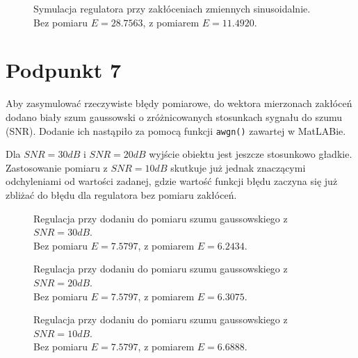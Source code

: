 \begin{figure}[ht]
\centering

\caption{Symulacja regulatora przy zakłóceniach zmiennych sinusoidalnie.\\Bez pomiaru $ E = \num{28,7563} $, z pomiarem $ E = \num{11,4920} $.}
\label{Z6a}
\end{figure}

\chapter{Podpunkt 7}
Aby zasymulować rzeczywiste błędy pomiarowe, do wektora mierzonach zakłóceń dodano biały szum gaussowski o zróżnicowanych stosunkach sygnału do szumu (SNR). Dodanie ich nastąpiło za pomocą funkcji \verb|awgn()| zawartej w MatLABie.

Dla $ \mathit{SNR} = 30\mathit{dB} $ i $ \mathit{SNR} = 20\mathit{dB} $ wyjście obiektu jest jeszcze stosunkowo gładkie. Zastosowanie pomiaru z $ \mathit{SNR} = 10\mathit{dB} $ skutkuje już jednak znaczącymi odchyleniami od wartości zadanej, gdzie wartość funkcji błędu zaczyna się już zbliżać do błędu dla regulatora bez pomiaru zakłóceń.

\begin{figure}[ht]
	\centering
	
	\caption{Regulacja przy dodaniu do pomiaru szumu gaussowskiego z $ \mathit{SNR} = 30\mathit{dB} $.\\Bez pomiaru $ E = \num{7,5797} $, z pomiarem $ E = \num{6,2434}  $.}
	\label{Z7a}
\end{figure}
\begin{figure}[ht]
	\centering
	
	\caption{Regulacja przy dodaniu do pomiaru szumu gaussowskiego z $ \mathit{SNR} = 20\mathit{dB} $.\\Bez pomiaru $ E = \num{7,5797} $, z pomiarem $ E = \num{6,3075} $.}
	\label{Z7b}
\end{figure}
\begin{figure}[ht]
	\centering
	
	\caption{Regulacja przy dodaniu do pomiaru szumu gaussowskiego z $ \mathit{SNR} = 10\mathit{dB} $.\\Bez pomiaru $ E = \num{7,5797} $, z pomiarem $ E = \num{6,6888} $. }
	\label{Z7c}
\end{figure}